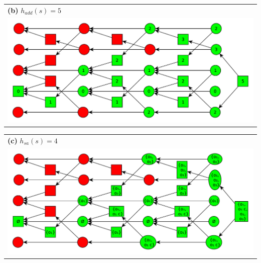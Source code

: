 \documentclass[11pt,a4paper]{article}
\begin{document}
\begin{tabular}{l} %
\textbf{(b)} $h_{add}(s)=5$\\
\includegraphics[scale=0.5]{g63b}\\
\end{tabular}

\begin{tabular}{l} %
\textbf{(c)} $h_{sa}(s)=4$\\
\includegraphics[scale=0.5]{g63c}\\
\end{tabular}
\end{document}
